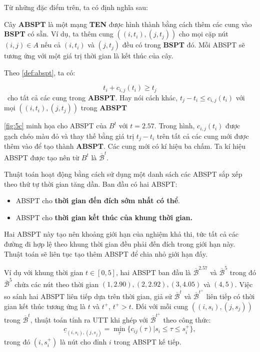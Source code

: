 \documentclass[../main.tex]{subfiles}
\begin{document}
Từ những đặc điểm trên, ta có định nghĩa sau:

\begin{definition}
\label{def:abspt}  
Cây \textbf{ABSPT} là một mạng \textbf{TEN} được hình thành bằng cách
thêm các cung vào \textbf{BSPT} có sẵn. Ví dụ, ta thêm cung
\(((i, t_i), (j, t_j))\) cho mọi cặp nút \((i, j) \in A\) nếu cả
\((i, t_i)\) và \((j, t_j)\) đều có trong \textbf{BSPT} đó. Mỗi ABSPT sẽ tương 
ứng với một giá trị thời gian là kết thúc của cây.
\end{definition}

Theo \autoref{def:abspt}, ta có:

  \[t_i + c_{i,j}(t_i) \ge t_j\]~cho tất cả các cung trong
  \textbf{ABSPT}. Hay nói cách khác, \(t_j - t_i \le c_{i,j}(t_i)\) với mọi
  \(((i, t_i), (j, t_j))\) trong \textbf{ABSPT}

\autoref{fig:5c} minh họa
cho ABSPT của \(B^t\) với \(t = 2.57\). Trong hình, \(c_{i,j}(t_i)\)
được gạch chéo màu đỏ và thay thế bằng giá trị \(t_j - t_i\) trên tất cả
các cung mới được thêm vào để tạo thành \textbf{ABSPT}. Các cung mới có
kí hiệu ba chấm. Ta kí hiệu ABSPT được tạo nên từ \(B^t\) là
\(\overline{\mathcal B}^t\).

Thuật toán hoạt động bằng cách sử dụng một danh sách các ABSPT
sắp xếp theo thứ tự thời gian tăng dần. Ban đầu có hai ABSPT:

\begin{itemize}
\tightlist
\item
  ABSPT cho \textbf{thời gian đến đích sớm nhất có thể}.
\item
  ABSPT cho \textbf{thời gian kết thúc của khung thời gian.}
\end{itemize}

Hai ABSPT này tạo nên khoảng giới hạn của nghiệm khả thi, tức tất cả các đường đi
hợp lệ theo khung thời gian đều phải đến đích trong giới hạn này. Thuật
toán sẽ liên tục tạo thêm ABSPT để chia nhỏ giới hạn đấy. 

Ví dụ với
khung thời gian \(t\in [0,5]\), hai ABSPT ban đầu là
\(\overline{\mathcal B}^{2.57}\) và \(\overline{\mathcal B}^{5}\) trong đó
\(\overline{\mathcal B}^{5}\) chứa các nút theo thời gian
\((1, 2.90), (2, 2.92), (3, 4.05)\) và \((4, 5)\). Việc so sánh hai ABSPT liên tiếp dựa trên thời gian,
giả sử \(\overline{\mathcal B}^t\) và
\(\overline{\mathcal B}^{t^+}\) liên tiếp có thời gian kết thúc tương ứng là
\(t\) và \(t^+\), \(t^+>t\). Đối với mỗi cung \(((i, s_i), (j, s_j))\)
trong \(\overline{\mathcal B}^t\), thuật toán tính ra UTT khi ghép với
\(\overline{\mathcal B}^{t^+}\) theo công thức:
\[    \underline c_{(i, s_i),(j, s_j)}=\min_\tau\{c_{ij}(\tau)|s_i\le\tau\le s_i^+\},\]
trong đó \((i, s_i^+)\) là nút cho đỉnh \(i\) trong ABSPT kế tiếp. 
\end{document}
